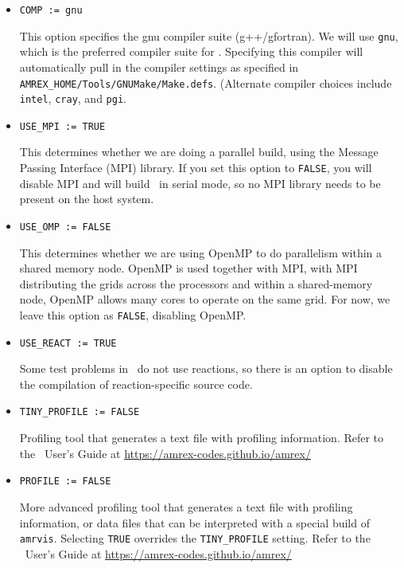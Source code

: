 \begin{enumerate}
\begin{itemize}
  \item {\tt COMP := gnu}

    This option specifies the gnu compiler suite (g++/gfortran).  
    We will use {\tt gnu}, which is the preferred compiler suite for \maestroex.
    Specifying this compiler will automatically pull in the compiler
    settings as specified in {\tt AMREX\_HOME/Tools/GNUMake/Make.defs}.
    (Alternate compiler choices include 
    {\tt intel}, {\tt cray}, and {\tt pgi}.

  \item {\tt USE\_MPI := TRUE}

    This determines whether we are doing a parallel build, using the
    Message Passing Interface (MPI) library.  If you set this option
    to {\tt FALSE}, you will disable MPI
    and will build \maestroex\ in serial
    mode, so no MPI library needs to be present on the host system.

  \item {\tt USE\_OMP := FALSE}

    This determines whether we are using OpenMP to do parallelism
    within a shared memory node.  OpenMP is used together with MPI,
    with MPI distributing the grids across the processors and within a
    shared-memory node, OpenMP allows many cores to operate on the
    same grid.  For now, we leave this option as {\tt FALSE}, disabling OpenMP.

  \item {\tt USE\_REACT := TRUE}

    Some test problems in \maestroex\ do not use reactions, so there is an
    option to disable the compilation of reaction-specific source code.

  \item {\tt TINY\_PROFILE := FALSE}

    Profiling tool that generates a text file with profiling information.
    Refer to the \amrex\ User's Guide at 
    \url{https://amrex-codes.github.io/amrex/}

  \item {\tt PROFILE := FALSE}

    More advanced profiling tool that generates a text file with profiling 
    information, or data files that can be interpreted with a special build of 
    {\tt amrvis}.  Selecting {\tt TRUE} overrides the {\tt TINY\_PROFILE} setting.
    Refer to the \amrex\ User's Guide at \url{https://amrex-codes.github.io/amrex/}

  \end{itemize}



\end{enumerate}

